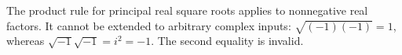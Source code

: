 The product rule for principal real square roots applies to nonnegative real factors. It cannot be extended to arbitrary complex inputs: $\sqrt{(-1)(-1)}=1$, whereas $\sqrt{-1}\sqrt{-1}=i^2=-1$. The second equality is invalid.
